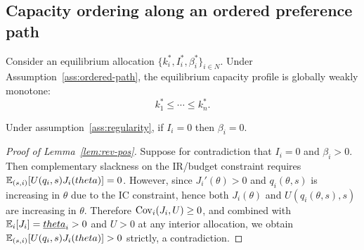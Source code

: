 \documentclass[master.tex]{subfiles}
\begin{document}
\subsection{Capacity ordering along an ordered preference path}

\begin{corollary}\label{cor:ordered-path}
Consider an equilibrium allocation \(\{k_i^\ast,I_i^\ast,\beta_i^\ast\}_{i\in N}\). Under Assumption~\ref{ass:ordered-path}, the equilibrium capacity profile is globally weakly monotone:
\[
k_1^\ast\le\cdots\le k_n^\ast.
\]
\end{corollary}

\begin{lemma}\label{lem:rev-pos}
Under assumption~\ref{ass:regularity}, if $I_i=0$ then $\beta_i=0$.
\end{lemma}
\begin{proof}[Proof of Lemma~\ref{lem:rev-pos}]
Suppose for contradiction that $I_i=0$ and $\beta_i>0$. Then complementary slackness on the IR/budget constraint requires $\mathbb{E}_{(s,i)}[U(q_i,s)J_i(theta)]=0$. However, since $J_i'(\theta)>0$ and $q_i(\theta,s)$ is increasing in $\theta$ due to the IC constraint, hence both $J_i(\theta)$ and $U(q_i(\theta,s),s)$ are increasing in $\theta$. Therefore $\mathrm{Cov}_{i}(J_i,U)\ge 0$, and combined with $\mathbb{E}_i[J_i]=\underline{theta}_i>0$ and $U>0$ at any interior allocation, we obtain $\mathbb{E}_{(s,i)}[U(q_i,s)J_i(theta)]>0$ strictly, a contradiction.
\end{proof}
\end{document}
